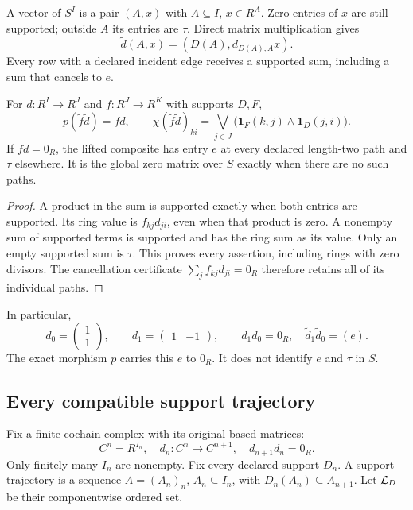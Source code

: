 A vector of \(S^I\) is a pair \((A,x)\) with \(A\subseteq I\),
\(x\in R^A\). Zero entries of \(x\) are still supported; outside
\(A\) its entries are \(\tau\). Direct matrix multiplication gives
\[
 \widetilde d(A,x)=(D(A),d_{D(A),A}x).
 \tag{SCD3}
\]
Every row with a declared incident edge receives a supported sum,
including a sum that cancels to \(e\).

\begin{proposition}
For \(d:R^I\to R^J\) and \(f:R^J\to R^K\) with supports \(D,F\),
\[
 p(\widetilde f\widetilde d)=fd,\qquad
 \chi(\widetilde f\widetilde d)_{ki}
 =\bigvee_{j\in J}\bigl(\mathbf1_F(k,j)\wedge\mathbf1_D(j,i)\bigr).
 \tag{SCD4}
\]
If \(fd=0_R\), the lifted composite has entry \(e\) at every
declared length-two path and \(\tau\) elsewhere. It is the global
zero matrix over \(S\) exactly when there are no such paths.
\end{proposition}
\begin{proof}
A product in the sum is supported exactly when both entries are
supported. Its ring value is \(f_{kj}d_{ji}\), even when that product
is zero. A nonempty sum of supported terms is supported and has the
ring sum as its value. Only an empty supported sum is \(\tau\).
This proves every assertion, including rings with zero divisors.
The cancellation certificate \(\sum_j f_{kj}d_{ji}=0_R\) therefore
retains all of its individual paths.
\end{proof}

In particular,
\[
 d_0=\begin{pmatrix}1\\1\end{pmatrix},\qquad
 d_1=\begin{pmatrix}1&-1\end{pmatrix},
 \qquad d_1d_0=0_R,\quad \widetilde d_1\widetilde d_0=(e).
 \tag{SCD5}
\]
The exact morphism \(p\) carries this \(e\) to \(0_R\).
It does not identify \(e\) and \(\tau\) in \(S\).

\subsection{Every compatible support trajectory}

Fix a finite cochain complex with its original based matrices:
\[
 C^n=R^{I_n},\quad d_n:C^n\to C^{n+1},\quad
 d_{n+1}d_n=0_R.
 \tag{SCD6}
\]
Only finitely many \(I_n\) are nonempty. Fix every declared support \(D_n\).
A support trajectory is a sequence \(A=(A_n)_n\), \(A_n\subseteq I_n\),
with \(D_n(A_n)\subseteq A_{n+1}\). Let \(\mathcal L_D\) be their componentwise
ordered set.

